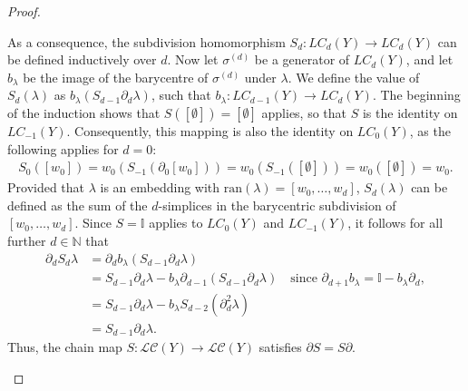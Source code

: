 \begin{proof}{\textit{\cite[Proof of Proposition 2.21]{hatcher2005algebraic}}}
\begin{enumerate}
	As a consequence, the subdivision homomorphism $S_d: LC_d(Y) \rightarrow LC_d(Y)$ can be defined inductively over $d$. Now let $\sigma^{(d)}$ be a generator of $LC_d(Y)$, and let $b_\lambda$ be the image of the barycentre of $\sigma^{(d)}$ under $\lambda$. We define the value of $S_d(\lambda)$ as $b_\lambda(S_{d-1}\partial_{d}\lambda)$, such that $b_\lambda: LC_{d-1}(Y) \rightarrow LC_d(Y)$. The beginning of the induction shows that $S([\emptyset]) = [\emptyset]$ applies, so that $S$ is the identity on $LC_{-1}(Y)$. Consequently, this mapping is also the identity on $LC_0(Y)$, as the following applies for $d=0$: 
	\begin{align}
		S_0([w_0]) = w_0(S_{-1}(\partial_0[w_0])) = w_0(S_{-1}([\emptyset])) = w_0([\emptyset]) = w_0. 
	\end{align}
	Provided that $\lambda$ is an embedding with $\text{ran}(\lambda) = [w_0, \ldots, w_d]$, $S_d(\lambda)$ can be defined as the sum of the $d$-simplices in the barycentric subdivision of $[w_0, \ldots, w_d]$. Since $S = \mathbb{I}$ applies to $LC_0(Y)$ and $LC_{-1}(Y)$, it follows for all further $d \in \mathbb{N}$ that
	\begin{align}
		\partial_{d} S_d\lambda & = \partial_d b_\lambda(S_{d-1}\partial_{d}\lambda) \nonumber\\
		                  & = S_{d-1}\partial_d\lambda - b_\lambda\partial_{d-1}(S_{d-1}\partial_d\lambda) \quad \text{since } \partial_{d+1} b_\lambda = \mathbb{I} - b_\lambda\partial_d, \nonumber\\
		                  & = S_{d-1}\partial_d\lambda - b_\lambda S_{d-2}(\partial^2_d\lambda) \nonumber\\
		                  & = S_{d-1}\partial_d\lambda.                                                                                     
	\end{align}
	Thus, the chain map $S: \mathcal{LC}(Y) \rightarrow \mathcal{LC}(Y)$ satisfies $\partial S = S\partial$.
		

\end{enumerate}
\end{proof}
